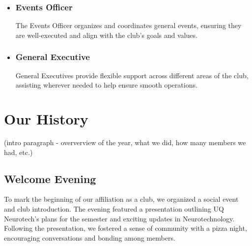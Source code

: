 \documentclass[a4paper,12pt]{report}
\begin{document}
\begin{itemize}
    \item \subsubsection{Events Officer}
    The Events Officer organizes and coordinates general events, ensuring they are well-executed and align with the club’s goals and values.

    \item \subsubsection{General Executive}
    General Executives provide flexible support across different areas of the club, assisting wherever 
    needed to help ensure smooth operations. 
\end{itemize}



\newpage

\section*{Our History}

(intro paragraph - oververview of the year, what we did, how many members we had, etc.)

\vspace{-1cm}

\subsection{Welcome Evening}
To mark the beginning of our affiliation as a club, we organized a social event and
club introduction. The evening featured a presentation outlining UQ Neurotech's
plans for the semester and exciting updates in Neurotechnology. Following the
presentation, we fostered a sense of community with a pizza night, encouraging
conversations and bonding among members.
\end{document}
